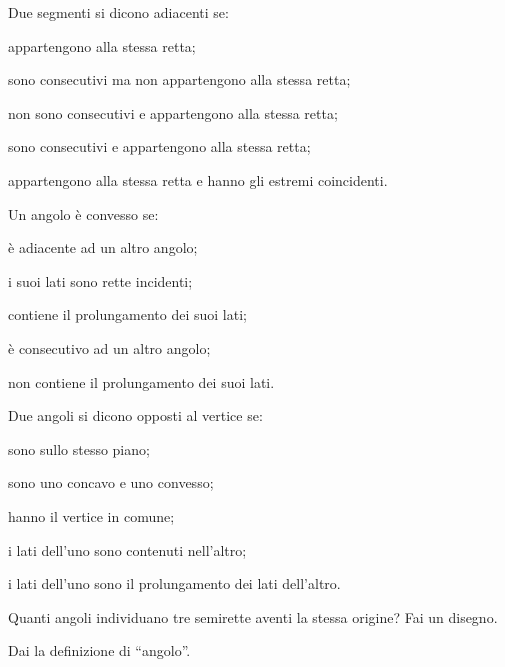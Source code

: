 \begin{esercizio}
\label{ese:1.50}
Due segmenti si dicono adiacenti se:
\begin{enumeratea}
\item appartengono alla stessa retta;
\item sono consecutivi ma non appartengono alla stessa retta;
\item non sono consecutivi e appartengono alla stessa retta;
\item sono consecutivi e appartengono alla stessa retta;
\item appartengono alla stessa retta e hanno gli estremi coincidenti.
\end{enumeratea}
\end{esercizio}

\begin{esercizio}
\label{ese:1.51}
Un angolo è convesso se:
\begin{enumeratea}
\item è adiacente ad un altro angolo;
\item i suoi lati sono rette incidenti;
\item contiene il prolungamento dei suoi lati;
\item è consecutivo ad un altro angolo;
\item non contiene il prolungamento dei suoi lati.
\end{enumeratea}
\end{esercizio}

\pagebreak

\begin{esercizio}
\label{ese:1.52}
Due angoli si dicono opposti al vertice se:
\begin{enumeratea}
\item sono sullo stesso piano;
\item sono uno concavo e uno convesso;
\item hanno il vertice in comune;
\item i lati dell'uno sono contenuti nell'altro;
\item i lati dell'uno sono il prolungamento dei lati dell'altro.
\end{enumeratea}
\end{esercizio}

\begin{esercizio}
\label{ese:1.53}
Quanti angoli individuano tre semirette aventi la stessa origine? Fai 
un disegno.
\end{esercizio}

\begin{esercizio}
\label{ese:1.54}
Dai la definizione di ``angolo''.
\end{esercizio}

